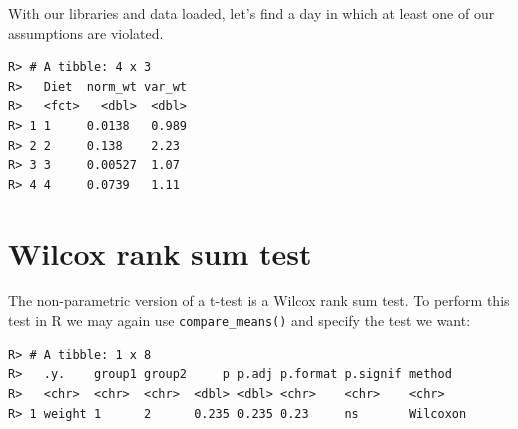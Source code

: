 \documentclass[english,10pt,a4paper,oneside]{book}
\newenvironment{Shaded}{\begin{snugshade}}{\end{snugshade}}
\newcommand{\KeywordTok}[1]{\textcolor[rgb]{0.13,0.29,0.53}{\textbf{#1}}}
\newcommand{\DataTypeTok}[1]{\textcolor[rgb]{0.13,0.29,0.53}{#1}}
\newcommand{\DecValTok}[1]{\textcolor[rgb]{0.00,0.00,0.81}{#1}}
\newcommand{\StringTok}[1]{\textcolor[rgb]{0.31,0.60,0.02}{#1}}
\newcommand{\CommentTok}[1]{\textcolor[rgb]{0.56,0.35,0.01}{\textit{#1}}}
\newcommand{\OperatorTok}[1]{\textcolor[rgb]{0.81,0.36,0.00}{\textbf{#1}}}
\newcommand{\NormalTok}[1]{#1}
\theoremstyle{definition}
\theoremstyle{definition}
\theoremstyle{definition}
\theoremstyle{remark}
\begin{document}
With our libraries and data loaded, let's find a day in which at least
one of our assumptions are violated.

\begin{Shaded}
\end{Shaded}

\begin{verbatim}
R> # A tibble: 4 x 3
R>   Diet  norm_wt var_wt
R>   <fct>   <dbl>  <dbl>
R> 1 1     0.0138   0.989
R> 2 2     0.138    2.23 
R> 3 3     0.00527  1.07 
R> 4 4     0.0739   1.11
\end{verbatim}

\section{Wilcox rank sum test}\label{wilcox-rank-sum-test-1}

The non-parametric version of a t-test is a Wilcox rank sum test. To
perform this test in R we may again use \texttt{compare\_means()} and
specify the test we want:

\begin{Shaded}
\end{Shaded}

\begin{verbatim}
R> # A tibble: 1 x 8
R>   .y.    group1 group2     p p.adj p.format p.signif method  
R>   <chr>  <chr>  <chr>  <dbl> <dbl> <chr>    <chr>    <chr>   
R> 1 weight 1      2      0.235 0.235 0.23     ns       Wilcoxon
\end{verbatim}
\end{document}
